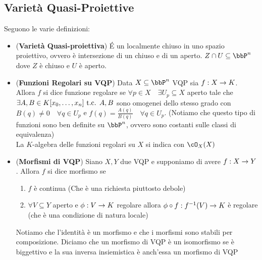 \documentclass[a4paper,NoNotes,GeneralMath]{stdmdoc}
\begin{document}
	\subsection*{Varietà Quasi-Proiettive}
	Seguono le varie definizioni:
	\begin{itemize}
		\item ({\bf Varietà Quasi-proiettiva}) É un localmente chiuso in uno spazio proiettivo, ovvero è intersezione di un chiuso e di un aperto. $Z \cap U \subseteq \bbP^n$ dove $Z$ è chiuso e $U$ è aperto.
		\item ({\bf Funzioni Regolari su VQP}) Data $X \subseteq \bbP^n$ VQP sia $f: X \rightarrow K$. Allora $f$ si dice funzione regolare se $\forall p \in X \quad \exists U_p \subseteq X$ aperto tale che $\exists A,B \in K[x_0, \ldots, x_n] \mbox{ t.c. } A, B$ sono omogenei dello stesso grado con $B(q) \neq 0 \quad \forall q \in U_p$ e $f(q) = \frac{A(q)}{B(q)} \quad \forall q \in U_p$. (Notiamo che questo tipo di funzioni sono ben definite su $\bbP^n$, ovvero sono costanti sulle classi di equivalenza) \\
		La $K$-algebra delle funzioni regolari su $X$ si indica con $\cO_X(X)$
		\item ({\bf Morfismi di VQP}) Siano $X, Y$ due VQP e supponiamo di avere $f: X \rightarrow Y$. Allora $f$ si dice morfismo se
		\begin{enumerate}
			\item $f$ è continua (Che è una richiesta piuttosto debole)
			\item $\forall V \subseteq Y$ aperto e $\phi: V \rightarrow K$ regolare allora $\phi \circ f: f^{-1}(V) \rightarrow K$ è regolare (che è una condizione di natura locale)
		\end{enumerate}
		Notiamo che l'identità è un morfismo e che i morfismi sono stabili per composizione. Diciamo che un morfismo di VQP è un isomorfismo se è biggettivo e la sua inversa insiemistica è anch'essa un morfismo di VQP
	\end{itemize}
	
\end{document}
